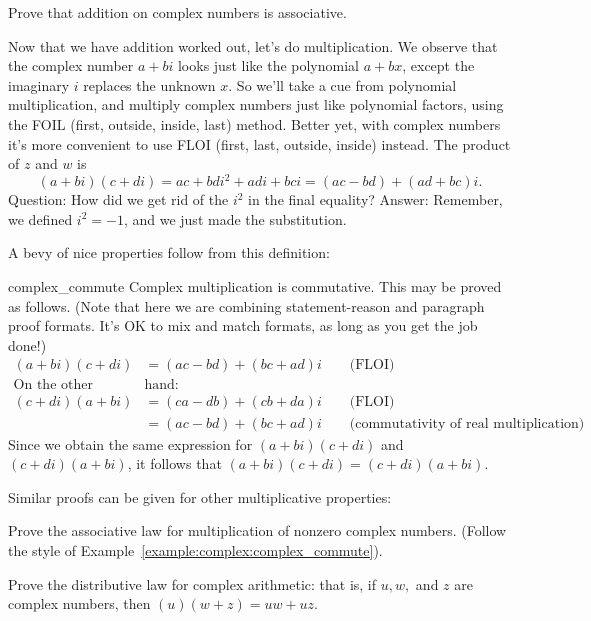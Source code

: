 \begin{exercise}{}
Prove that addition on complex numbers is associative.
\end{exercise}

Now that we have addition worked out, let's do multiplication. We observe that the complex number $a + bi$ looks just  like the polynomial $a + bx$, except the imaginary $i$ replaces the unknown $x$. So we'll take a cue from polynomial multiplication, and  multiply complex numbers just like
polynomial factors, using the FOIL (first, outside, inside, last) method. Better yet, with complex numbers it's more convenient to use FLOI (first, last, outside, inside) instead.  The product of $z$ and
$w$ is \[
(a+bi)(c+di)=ac+bdi^{2}+adi+bci=(ac-bd)+(ad+bc)i.\]
Question: How did we get rid of the $i^2$ in the final equality?  Answer: Remember, we defined $i^2 = -1$, and we just made the substitution.

A bevy of nice properties follow from this definition:

\begin{example}{complex_commute}
Complex multiplication is commutative.  This may be proved as follows. (Note that here we are combining statement-reason and paragraph proof formats.  It's OK to mix and match formats, as long as you get the job done!) 
\begin{align*}
(a + bi)(c + di) &= (ac - bd) + (bc + ad)i \qquad \text{(FLOI)}\\
\text{On the other }&\text{hand:}\\
(c + di)(a + bi) &= (ca - db) + (cb + da)i \qquad \text{(FLOI)}\\
& = (ac - bd) + (bc + ad)i \qquad \text{(commutativity of real multiplication)}
\end{align*}
Since we obtain the same expression for $(a + bi)(c + di)$ and $(c + di)(a + bi)$, it follows that 
$(a + bi)(c + di) = (c + di)(a + bi)$.
\end{example}

Similar proofs can be given for other multiplicative properties:

\begin{exercise}{16}
Prove the associative law for multiplication of nonzero complex numbers. (Follow the style of Example~\ref{example:complex:complex_commute}).
\end{exercise}

\begin{exercise}{17}
Prove the distributive law for complex arithmetic: that is, if $u,w,$ and $z$ are complex numbers, then $(u)(w+z) = uw + uz$.
\end{exercise}

